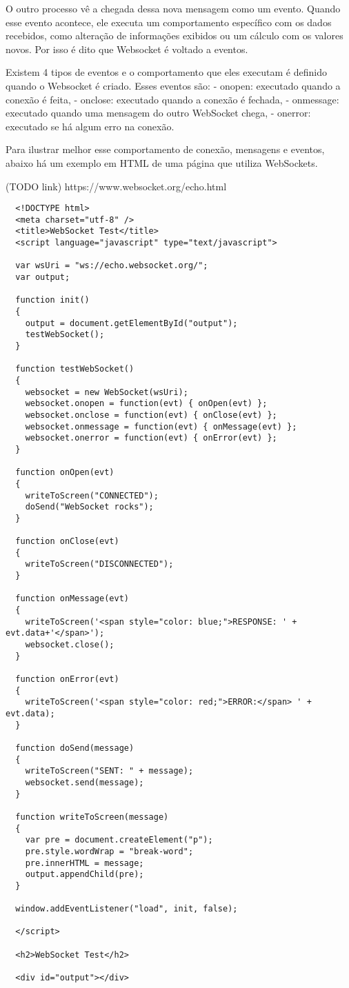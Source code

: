 \documentclass[a4paper,12pt]{article}
\begin{document}
O outro processo vê a chegada dessa nova mensagem como um evento. Quando esse evento acontece, ele executa um comportamento específico com os dados recebidos, como alteração de informações exibidos ou um cálculo com os valores novos. Por isso é dito que Websocket é voltado a eventos.

Existem 4 tipos de eventos e o comportamento que eles executam é definido quando o Websocket é criado. Esses eventos são:
- onopen: executado quando a conexão é feita,
- onclose: executado quando a conexão é fechada,
- onmessage: executado quando uma mensagem do outro WebSocket chega,
- onerror: executado se há algum erro na conexão.


Para ilustrar melhor esse comportamento de conexão, mensagens e eventos, abaixo há um exemplo em HTML de uma página que utiliza WebSockets.

(TODO link)
https://www.websocket.org/echo.html

\begin{small}
\begin{verbatim}
  <!DOCTYPE html>
  <meta charset="utf-8" />
  <title>WebSocket Test</title>
  <script language="javascript" type="text/javascript">

  var wsUri = "ws://echo.websocket.org/";
  var output;

  function init()
  {
    output = document.getElementById("output");
    testWebSocket();
  }

  function testWebSocket()
  {
    websocket = new WebSocket(wsUri);
    websocket.onopen = function(evt) { onOpen(evt) };
    websocket.onclose = function(evt) { onClose(evt) };
    websocket.onmessage = function(evt) { onMessage(evt) };
    websocket.onerror = function(evt) { onError(evt) };
  }

  function onOpen(evt)
  {
    writeToScreen("CONNECTED");
    doSend("WebSocket rocks");
  }

  function onClose(evt)
  {
    writeToScreen("DISCONNECTED");
  }

  function onMessage(evt)
  {
    writeToScreen('<span style="color: blue;">RESPONSE: ' + evt.data+'</span>');
    websocket.close();
  }

  function onError(evt)
  {
    writeToScreen('<span style="color: red;">ERROR:</span> ' + evt.data);
  }

  function doSend(message)
  {
    writeToScreen("SENT: " + message);
    websocket.send(message);
  }

  function writeToScreen(message)
  {
    var pre = document.createElement("p");
    pre.style.wordWrap = "break-word";
    pre.innerHTML = message;
    output.appendChild(pre);
  }

  window.addEventListener("load", init, false);

  </script>

  <h2>WebSocket Test</h2>

  <div id="output"></div>

\end{verbatim}
\end{small}
\end{document}
